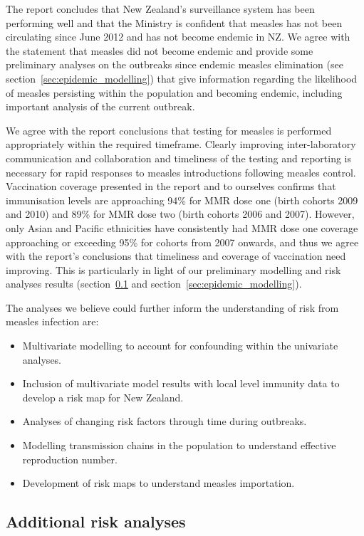 \documentclass{article}
\begin{document}
The report concludes that New Zealand's surveillance system has been performing well and that the Ministry is confident that measles has not been circulating since June 2012 and has not become endemic in NZ. We agree with the statement that measles did not become endemic and provide some preliminary analyses on the outbreaks since endemic measles elimination (see section~\ref{sec:epidemic_modelling}) that give information regarding the likelihood of measles persisting within the population and becoming endemic, including important analysis of the current outbreak.

We agree with the report conclusions that testing for measles is performed appropriately within the required timeframe. Clearly improving inter-laboratory communication and collaboration and timeliness of the testing and reporting is necessary for rapid responses to measles introductions following measles control. Vaccination coverage presented in the report and to ourselves confirms that immunisation levels are approaching 94\% for MMR dose one (birth cohorts 2009 and 2010) and 89\% for MMR dose two (birth cohorts 2006 and 2007). However, only Asian and Pacific ethnicities have consistently had MMR dose one coverage approaching or exceeding 95\% for cohorts from 2007 onwards, and thus we agree with the report's conclusions that timeliness and coverage of vaccination need improving. This is particularly in light of our preliminary modelling and risk analyses results (section~\ref{sub:risk_analyses} and section~\ref{sec:epidemic_modelling}).

The analyses we believe could further inform the understanding of risk from measles infection are:
\begin{itemize}
\item Multivariate modelling to account for confounding within the univariate analyses.
\item Inclusion of multivariate model results with local level immunity data to develop a risk map for New Zealand.
\item Analyses of changing risk factors through time during outbreaks.
\item Modelling transmission chains in the population to understand effective reproduction number.
\item Development of risk maps to understand measles importation.
\end{itemize}

\subsection{Additional risk analyses}
\label{sub:risk_analyses}
\end{document}
